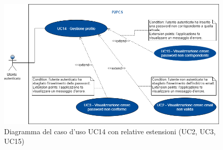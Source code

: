 \begin{figure}[h]
	\includegraphics[width=15cm]{res/images/Schemagenerale5.png}
	\centering
	\caption{Diagramma del caso d'uso UC14 con relative estensioni (UC2, UC3, UC15)}
\end{figure}
